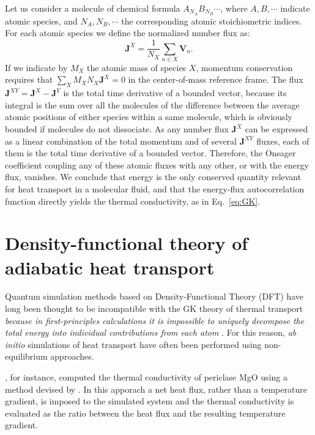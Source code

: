 Let us consider a molecule of chemical formula $A_{N_A} B_{N_B}\cdots$, where $A, B,\cdots$ indicate atomic species, and $N_A,N_B,\cdots$ the corresponding atomic stoichiometric indices. For each atomic species we define the normalized number flux as:
\begin{equation}
  \mathbf{J}^X = \frac{1}{N_X}\sum_{n\in X} \mathbf{V}_n. \label{eq:JX}
\end{equation}
If we indicate by $M_X$ the atomic mass of species $X$, momentum conservation requires that $\sum_X M_X N_X \mathbf{J}^X = 0$ in the center-of-mass reference frame. The flux $\mathbf{J}^{XY} = \mathbf{J}^{X}-\mathbf{J}^{Y}$ is the total time derivative of a bounded vector, because its integral is the sum over all the molecules of the difference between the average atomic positions of either species within a same molecule, which is obviously bounded if molecules do not dissociate. As any number flux $\mathbf{J}^X$ can be expressed as a linear combination of the total momentum and of several $\mathbf{J}^{XY}$ fluxes, each of them is the total time derivative of a bounded vector. Therefore, the Onsager coefficient coupling any of these atomic fluxes with any other, or with the energy flux, vanishes. We conclude that energy is the only conserved quantity relevant for heat transport in a molecular fluid, and that the energy-flux autocorrelation function directly yields the thermal conductivity, as in Eq.~\eqref{eq:GK}.


\section{Density-functional theory of adiabatic heat transport} \label{sec:DFT}
Quantum simulation methods based on Density-Functional Theory (DFT) have long been thought to be incompatible with the GK theory of thermal transport \emph{because in first-principles calculations it is impossible to uniquely decompose the total energy into individual contributions from each atom} \citep{Stackhouse2010b}. For this reason, \emph{ab initio} simulations of heat transport have often been performed using non-equilibrium approaches.

\cite{Stackhouse2010b}, for instance, computed the thermal conductivity of periclase MgO using a method devised by \cite{Müller-Plathe1997}. In this apporach a net heat flux, rather than a temperature gradient, is imposed to the simulated system and the thermal conductivity is evaluated as the ratio between the heat flux and the resulting temperature gradient.

